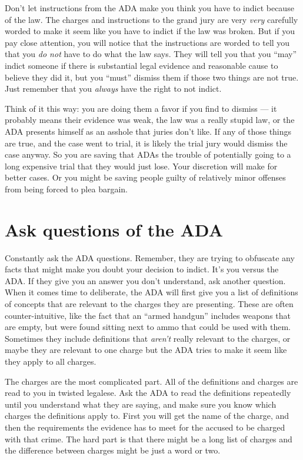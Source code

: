 \documentclass[letterpaper]{article}
\begin{document}
Don't let instructions from the ADA make you think you have to indict because of the law.
The charges and instructions to the grand jury are very \emph{very} carefully worded to make it seem like you have to indict if the law was broken.
But if you pay close attention, you will notice that the instructions are worded to tell you that you \emph{do not} have to do what the law says.
They will tell you that you ``may'' indict someone if there is substantial legal evidence and reasonable cause to believe they did it, but you ``must'' dismiss them if those two things are not true.  
Just remember that you \emph{always} have the right to not indict. 

Think of it this way: you are doing them a favor if you find to dismiss --- it probably means their evidence was weak, the law was a really stupid law, or the ADA presents himself as an asshole that juries don't like. 
If any of those things are true, and the case went to trial, it is likely the trial jury would dismiss the case anyway. 
So you are saving that ADAs the trouble of potentially going to a long expensive trial that they would just lose. Your discretion will make for better cases.
Or you might be saving people guilty of relatively minor offenses from being forced to plea bargain.


\section*{Ask questions of the ADA}
Constantly ask the ADA questions. 
Remember, they are trying to obfuscate any facts that might make you doubt your decision to indict.  
It's you versus the ADA. 
If they give you an answer you don't understand, ask another question. 
When it comes time to deliberate, the ADA will first give you a list of definitions of concepts that are relevant to the charges they are presenting. 
These are often counter-intuitive, like the fact that an ``armed handgun'' includes weapons that are empty, but were found sitting next to ammo that could be used with them.
Sometimes they include definitions that \emph{aren't} really relevant to the charges, or maybe they are relevant to one charge but the ADA tries to make it seem like they apply to all charges. 

The charges are the most complicated part. 
All of the definitions and charges are read to you in twisted legalese.
Ask the ADA to read the definitions repeatedly until you understand what they are saying, and make sure you know which charges the definitions apply to.  
First you will get the name of the charge, and then the requirements the evidence has to meet for the accused to be charged with that crime. 
The hard part is that there might be a long list of charges and the difference between charges might be just a word or two. 
\end{document}
